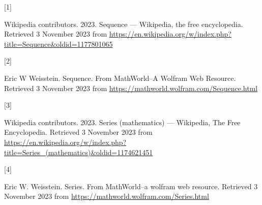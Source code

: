 \documentclass[
  a4paper,
]{article}
\newlength{\cslhangindent}
\newlength{\csllabelwidth}
\newlength{\cslentryspacingunit} %
\newenvironment{CSLReferences}[2] %
 {%
  \setlength{\parindent}{0pt}
  \ifodd #1
  \let\oldpar\par
  \def\par{\hangindent=\cslhangindent\oldpar}
  \fi
  \setlength{\parskip}{#2\cslentryspacingunit}
 }%
 {}
\newcommand{\CSLLeftMargin}[1]{\parbox[t]{\csllabelwidth}{#1}}
\newcommand{\CSLRightInline}[1]{\parbox[t]{\linewidth - \csllabelwidth}{#1}\break}
\begin{document}
\hypertarget{refs}{}
\begin{CSLReferences}{0}{0}
\leavevmode{}%
\CSLLeftMargin{{[}1{]} }%
\CSLRightInline{Wikipedia contributors. 2023. Sequence ---
{Wikipedia}{,} the free encyclopedia. Retrieved 3 November 2023 from
\url{https://en.wikipedia.org/w/index.php?title=Sequence\&oldid=1177801065}}

\leavevmode{}%
\CSLLeftMargin{{[}2{]} }%
\CSLRightInline{Eric W Weisstein. {Sequence. From MathWorld--A Wolfram
Web Resource}. Retrieved 3 November 2023 from
\url{https://mathworld.wolfram.com/Sequence.html}}

\leavevmode{}%
\CSLLeftMargin{{[}3{]} }%
\CSLRightInline{Wikipedia contributors. 2023. {Series (mathematics) ---
{Wikipedia}{,} The Free Encyclopedia}. Retrieved 3 November 2023 from
\url{https://en.wikipedia.org/w/index.php?title=Series_(mathematics)\&oldid=1174621451}}

\leavevmode{}%
\CSLLeftMargin{{[}4{]} }%
\CSLRightInline{Eric W. Weisstein. Series. From MathWorld--a wolfram web
resource. Retrieved 3 November 2023 from
\url{https://mathworld.wolfram.com/Series.html}}

\end{CSLReferences}
\end{document}
